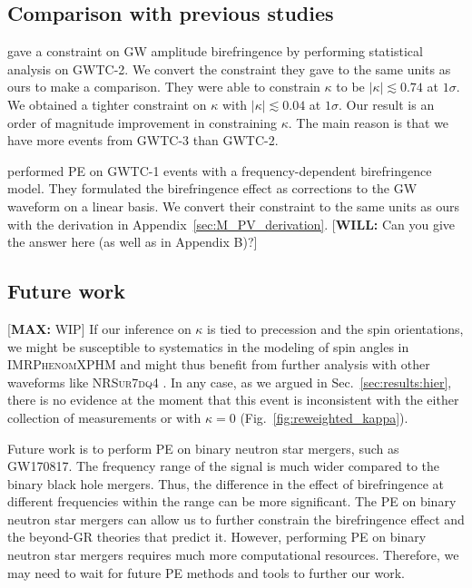 \documentclass[aps,prd,twocolumn,superscriptaddress,preprintnumbers,floatfix,nofootinbib]{revtex4-2}
\newcommand*{\mi}[1]{\textsf{\color{magenta} [\textbf{MAX:} #1]}}
\newcommand*{\wf}[1]{\textsf{\color{cyan} [\textbf{WILL:} #1]}}
\begin{document}
\subsection{Comparison with previous studies}
\citet{Okounkova_2022} gave a constraint on GW amplitude birefringence by performing statistical analysis on GWTC-2.
We convert the constraint they gave to the same units as ours to make a comparison.
They were able to constrain $\kappa$ to be $|\kappa| \lesssim 0.74$ at $1 \sigma$.
We obtained a tighter constraint on $\kappa$ with $|\kappa| \lesssim 0.04$ at $1 \sigma$.
Our result is an order of magnitude improvement in constraining $\kappa$.
The main reason is that we have more events from GWTC-3 than GWTC-2.

\citet{Wang_2021} performed \ac{PE} on GWTC-1 events with a frequency-dependent birefringence model.
They formulated the birefringence effect as corrections to the GW waveform on a linear basis.
We convert their constraint to the same units as ours with the derivation in Appendix~\ref{sec:M_PV_derivation}.  \wf{Can you give the answer here (as well as in Appendix B)?}

\subsection{Future work}

\mi{WIP}
If our inference on $\kappa$ is tied to precession and the spin orientations, we might be susceptible to systematics in the modeling of spin angles in \textsc{IMRPhenomXPHM} and might thus benefit from further analysis with other waveforms like \textsc{NRSur7dq4} \cite{Varma:2018mmi}.
In any case, as we argued in Sec.~\ref{sec:results:hier}, there is no evidence at the moment that this event is inconsistent with the either collection of measurements or with $\kappa = 0$ (Fig.~\ref{fig:reweighted_kappa}).

Future work is to perform \ac{PE} on binary neutron star mergers, such as GW170817.
The frequency range of the signal is much wider compared to the binary black hole mergers.
Thus, the difference in the effect of birefringence at different frequencies within the range can be more significant.
The \ac{PE} on binary neutron star mergers can allow us to further constrain the birefringence effect and the beyond-GR theories that predict it.
However, performing \ac{PE} on binary neutron star mergers requires much more computational resources.
Therefore, we may need to wait for future \ac{PE} methods and tools to further our work.
\end{document}
